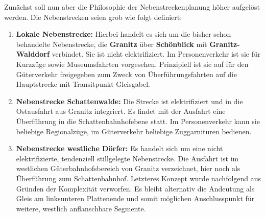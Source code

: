 Zun\"achst soll nun aber die Philosophie der Nebenstreckenplanung h\"oher aufgel\"ost werden.
Die Nebenstrecken seien grob wie folgt definiert:
\begin{enumerate}
	\item \textbf{Lokale Nebenstrecke:}
	Hierbei handelt es sich um die bisher schon behandelte Nebenstrecke, die \textbf{Granitz} \"uber \textbf{Sch\"onblick} mit \textbf{Granitz-Walddorf} verbindet.
	Sie ist nicht elektrifiziert.
	Im Personenverkehr ist sie f\"ur Kurzz\"uge sowie Museumsfahrten vorgesehen.
	Prinzipiell ist sie auf f\"ur den G\"uterverkehr freigegeben zum Zweck von \"Uberf\"uhrungsfahrten auf die Hauptstrecke mit Transitpunkt Gleisgabel.
	\item \textbf{Nebenstrecke Schattenwalde:}
	Die Strecke ist elektrifiziert und in die Ostausfahrt aus Granitz integriert.
	Es findet mit der Ausfahrt eine \"Uberf\"uhrung in die Schattenbahnhofebene statt.
	Im Personenverkehr kann sie beliebige Regionalz\"uge, im G\"uterverkehr beliebige Zuggarnituren bedienen.
	\item \textbf{Nebenstrecke westliche D\"orfer:}
	Es handelt sich um eine nicht elektrifizierte, tendenziell stillgelegte Nebenstrecke.
	Die Ausfahrt ist im westlichen G\"uterbahnhofsbereich von Granitz verzeichnet, hier noch als \"Uberf\"uhrung zum Schattenbahnhof.
	Letzteres Konzept wurde nachfolgend aus Gr\"unden der Komplexit\"at verworfen.
	Es bleibt alternativ die Andeutung als Gleis am linksunteren Plattenende und somit m\"oglichen Anschlusspunkt f\"ur weitere, westlich anflanschbare Segmente.
\end{enumerate}

